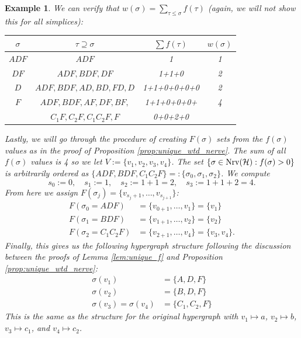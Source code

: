 \documentclass{amsart}
\newtheorem{example}[theorem]{Example}
\renewcommand{\H}{\mathcal{H}}
\newcommand{\Nrv}{\mm{\mathrm{Nrv}}}
\newcommand {\mm}[1]        {\ifmmode{#1}\else{\mbox{\(#1\)}}\fi}
\begin{document}
\begin{example}
We can verify that $w(\sigma) = \sum_{\tau \leq \sigma} f(\tau)$ (again, we will not show this for all simplices):
\begin{center}
\begin{tabular}{cccc}
$\sigma$ & $\tau \supseteq \sigma$ & $\sum f(\tau)$ & $w(\sigma)$\\\hline\hline
$ADF$    & $ADF$                   & 1              & 1 \\\hline
$DF$     & $ADF, BDF, DF$          & 1+1+0          & 2 \\\hline
$D$      & $ADF, BDF, AD, BD, FD, D$ & 1+1+0+0+0+0  & 2 \\\hline
$F$      & $ADF, BDF, AF, DF, BF, $  & 1+1+0+0+0+   & 4 \\
         & $C_1F, C_2F, C_1C_2F, F$  & 0+0+2+0      &   \\\hline
\end{tabular}
\end{center}
\vspace{1em}

Lastly, we will go through the procedure of creating $F(\sigma)$ sets from the $f(\sigma)$ values as in the proof of Proposition \ref{prop:unique_wtd_nerve}. The sum of all $f(\sigma)$ values is 4 so we let $V:=\{v_1, v_2, v_3, v_4\}$. The set $\{\sigma \in \Nrv(\H) : f(\sigma) > 0\}$ is arbitrarily ordered as $\{ADF, BDF, C_1C_2F\} =: \{\sigma_0, \sigma_1, \sigma_2\}$. We compute 
\[s_0 := 0, \quad s_1 := 1, \quad s_2 := 1+1=2, \quad s_3 := 1+1+2 = 4.\]
From here we assign $F(\sigma_j) = \{v_{s_j+1}, \ldots, v_{s_{j+1}}\}$:
\begin{align*}
F(\sigma_0=ADF) &= \{v_{0+1}, \ldots, v_{1}\} = \{v_1\}\\
F(\sigma_1=BDF) &= \{v_{1+1}, \ldots, v_{2}\} = \{v_2\}\\
F(\sigma_2=C_1C_2F) &= \{v_{2+1}, \ldots, v_{4}\} = \{v_3, v_4\}.
\end{align*}
Finally, this gives us the following hypergraph structure following the discussion between the proofs of Lemma \ref{lem:unique_f} and Proposition \ref{prop:unique_wtd_nerve}:
\begin{align*}
    \sigma(v_1) &= \{A, D, F\}\\
    \sigma(v_2) &= \{B, D, F\}\\
    \sigma(v_3) = \sigma(v_4) &= \{C_1, C_2, F\}
\end{align*}
This is the same as the structure for the original hypergraph with $v_1 \mapsto a$, $v_2\mapsto b$, $v_3\mapsto c_1$, and $v_4\mapsto c_2$.
\end{example}
\end{document}

